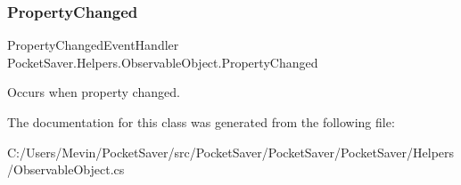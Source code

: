 \subsubsection{\texorpdfstring{Property\+Changed}{PropertyChanged}}
{\footnotesize\ttfamily Property\+Changed\+Event\+Handler Pocket\+Saver.\+Helpers.\+Observable\+Object.\+Property\+Changed}



Occurs when property changed. 



The documentation for this class was generated from the following file\+:\begin{DoxyCompactItemize}
\item 
C\+:/\+Users/\+Mevin/\+Pocket\+Saver/src/\+Pocket\+Saver/\+Pocket\+Saver/\+Pocket\+Saver/\+Helpers/Observable\+Object.\+cs\end{DoxyCompactItemize}

